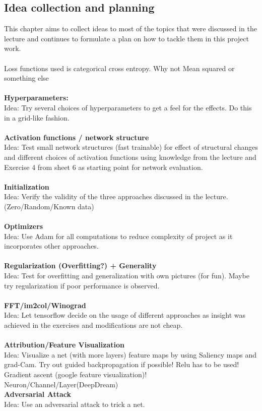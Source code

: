 \documentclass{article}
\begin{document}
\begin{multicols}{2}
\section{Idea collection and planning}
\label{ideas}
This chapter aims to collect ideas to most of the topics that were discussed in the lecture and continues to formulate a plan on how to tackle them in this project work.\\
\\
Loss functions used is categorical cross entropy. Why not Mean squared or something else\\
\\
\textbf{Hyperparameters:}\\
Idea: Try several choices of hyperparameters to get a feel for the effects. Do this in a grid-like fashion.\\
\\
\textbf{Activation functions / network structure}\\
Idea: Test small network structures (fast trainable) for effect of structural changes and different choices of activation functions using knowledge from the lecture and Exercise 4 from sheet 6 as starting point for network evaluation.\\
\\
\textbf{Initialization}\\
Idea: Verify the validity of the three approaches discussed in the lecture. (Zero/Random/Known data)\\
\\
\textbf{Optimizers}\\
Idea: Use Adam for all computations to reduce complexity of project as it incorporates other approaches.\\
\\
\textbf{Regularization (Overfitting?) + Generality}\\
Idea: Test for overfitting and generalization with own pictures (for fun). Maybe try regularization if poor performance is observed.\\
\\
\textbf{FFT/im2col/Winograd}\\
Idea: Let tensorflow decide on the usage of different approaches as insight was achieved in the exercises and modifications are not cheap.\\
\\
\textbf{Attribution/Feature Visualization}\\
Idea: Visualize a net (with more layers) feature maps by using Saliency maps and grad-Cam. Try out guided backpropagation if possible! Relu has to be used! Gradient ascent (google feature visualization)!\\
Neuron/Channel/Layer(DeepDream)
\\
\textbf{Adversarial Attack}\\
Idea: Use an adversarial attack to trick a net.


\end{multicols}
\end{document}
